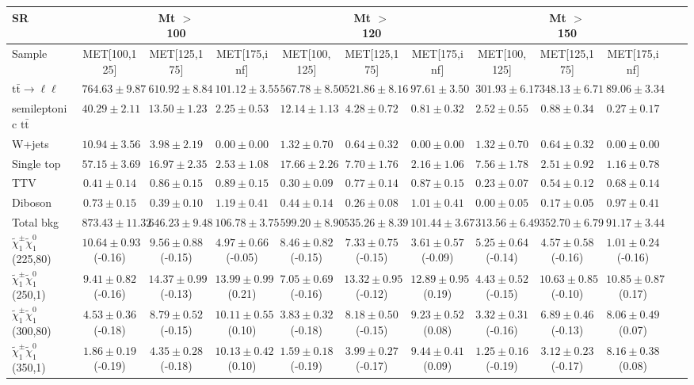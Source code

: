 \begin{table}
\begin{center}
\small
\begin{tabular}{lccccccccccc}
\hline
SR & & Mt $>$ 100 & & & Mt $>$ 120 & & &Mt $>$ 150 & & &\\
\hline
Sample&MET[100,125]&MET[125,175]&MET[175,inf]&MET[100,125]&MET[125,175]&MET[175,inf]&MET[100,125]&MET[125,175]&MET[175,inf]&\\
\hline
$\mathrm{t}\bar{\mathrm{t}}\rightarrow \ell\ell$&$764.63\pm9.87$&$610.92\pm8.84$&$101.12\pm3.55$&$567.78\pm8.50$&$521.86\pm8.16$&$97.61\pm3.50$&$301.93\pm6.17$&$348.13\pm6.71$&$89.06\pm3.34$\\
semileptonic $\mathrm{t}\bar{\mathrm{t}}$&$40.29\pm2.11$&$13.50\pm1.23$&$2.25\pm0.53$&$12.14\pm1.13$&$4.28\pm0.72$&$0.81\pm0.32$&$2.52\pm0.55$&$0.88\pm0.34$&$0.27\pm0.17$\\
W+jets&$10.94\pm3.56$&$3.98\pm2.19$&$0.00\pm0.00$&$1.32\pm0.70$&$0.64\pm0.32$&$0.00\pm0.00$&$1.32\pm0.70$&$0.64\pm0.32$&$0.00\pm0.00$\\
Single top&$57.15\pm3.69$&$16.97\pm2.35$&$2.53\pm1.08$&$17.66\pm2.26$&$7.70\pm1.76$&$2.16\pm1.06$&$7.56\pm1.78$&$2.51\pm0.92$&$1.16\pm0.78$\\
TTV&$0.41\pm0.14$&$0.86\pm0.15$&$0.89\pm0.15$&$0.30\pm0.09$&$0.77\pm0.14$&$0.87\pm0.15$&$0.23\pm0.07$&$0.54\pm0.12$&$0.68\pm0.14$\\
Diboson&$0.73\pm0.15$&$0.39\pm0.10$&$1.19\pm0.41$&$0.44\pm0.14$&$0.26\pm0.08$&$1.01\pm0.41$&$0.00\pm0.05$&$0.17\pm0.05$&$0.97\pm0.41$\\
\hline
Total bkg&$873.43\pm11.32$&$646.23\pm9.48$&$106.78\pm3.75$&$599.20\pm8.90$&$535.26\pm8.39$&$101.44\pm3.67$&$313.56\pm6.49$&$352.70\pm6.79$&$91.17\pm3.44$\\
$\tilde{\chi}_{1}^{\pm}\tilde{\chi}_{1}^{0}$ (225,80)&$10.64\pm0.93$(-0.16)&$9.56\pm0.88$(-0.15)&$4.97\pm0.66$(-0.05)&$8.46\pm0.82$(-0.15)&$7.33\pm0.75$(-0.15)&$3.61\pm0.57$(-0.09)&$5.25\pm0.64$(-0.14)&$4.57\pm0.58$(-0.16)&$1.01\pm0.24$(-0.16)\\
$\tilde{\chi}_{1}^{\pm}\tilde{\chi}_{1}^{0}$ (250,1)&$9.41\pm0.82$(-0.16)&$14.37\pm0.99$(-0.13)&$13.99\pm0.99$(0.21)&$7.05\pm0.69$(-0.16)&$13.32\pm0.95$(-0.12)&$12.89\pm0.95$(0.19)&$4.43\pm0.52$(-0.15)&$10.63\pm0.85$(-0.10)&$10.85\pm0.87$(0.17)\\
$\tilde{\chi}_{1}^{\pm}\tilde{\chi}_{1}^{0}$ (300,80)&$4.53\pm0.36$(-0.18)&$8.79\pm0.52$(-0.15)&$10.11\pm0.55$(0.10)&$3.83\pm0.32$(-0.18)&$8.18\pm0.50$(-0.15)&$9.23\pm0.52$(0.08)&$3.32\pm0.31$(-0.16)&$6.89\pm0.46$(-0.13)&$8.06\pm0.49$(0.07)\\
$\tilde{\chi}_{1}^{\pm}\tilde{\chi}_{1}^{0}$ (350,1)&$1.86\pm0.19$(-0.19)&$4.35\pm0.28$(-0.18)&$10.13\pm0.42$(0.10)&$1.59\pm0.18$(-0.19)&$3.99\pm0.27$(-0.17)&$9.44\pm0.41$(0.09)&$1.25\pm0.16$(-0.19)&$3.12\pm0.23$(-0.17)&$8.16\pm0.38$(0.08)\\
\hline
\hline\hline
\end{tabular}
\end{center}
\end{table}
